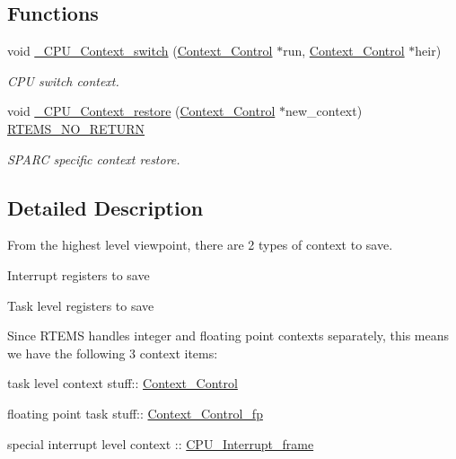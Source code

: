 \subsection*{Functions}
\begin{DoxyCompactItemize}
\item 
void \mbox{\hyperlink{group__RTEMSScoreCPUV850CPUContext_gaa9f8cc989454b28232e5375e30c90970}{\+\_\+\+C\+P\+U\+\_\+\+Context\+\_\+switch}} (\mbox{\hyperlink{structContext__Control}{Context\+\_\+\+Control}} $\ast$run, \mbox{\hyperlink{structContext__Control}{Context\+\_\+\+Control}} $\ast$heir)
\begin{DoxyCompactList}\small\item\em C\+PU switch context. \end{DoxyCompactList}\item 
void \mbox{\hyperlink{group__RTEMSScoreCPUV850CPUContext_ga80726ebfe00f31a88b086cc4474c472f}{\+\_\+\+C\+P\+U\+\_\+\+Context\+\_\+restore}} (\mbox{\hyperlink{structContext__Control}{Context\+\_\+\+Control}} $\ast$new\+\_\+context) \mbox{\hyperlink{group__RTEMSScoreBaseDefs_gaa2f0ed67aa174f684bb31b7e8bdb386f}{R\+T\+E\+M\+S\+\_\+\+N\+O\+\_\+\+R\+E\+T\+U\+RN}}
\begin{DoxyCompactList}\small\item\em S\+P\+A\+RC specific context restore. \end{DoxyCompactList}\end{DoxyCompactItemize}


\subsection{Detailed Description}
From the highest level viewpoint, there are 2 types of context to save.


\begin{DoxyEnumerate}
\item Interrupt registers to save
\item Task level registers to save
\end{DoxyEnumerate}

Since R\+T\+E\+MS handles integer and floating point contexts separately, this means we have the following 3 context items\+:


\begin{DoxyEnumerate}
\item task level context stuff\+:\+: \mbox{\hyperlink{structContext__Control}{Context\+\_\+\+Control}}
\item floating point task stuff\+:\+: \mbox{\hyperlink{structContext__Control__fp}{Context\+\_\+\+Control\+\_\+fp}}
\item special interrupt level context \+:: \mbox{\hyperlink{structCPU__Interrupt__frame}{C\+P\+U\+\_\+\+Interrupt\+\_\+frame}}
\end{DoxyEnumerate}

